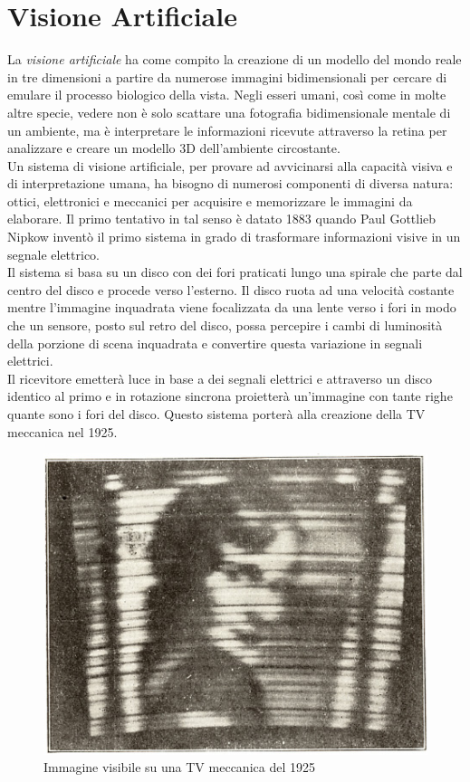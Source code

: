 \chapter{Visione Artificiale}
\fancyfoot[C]{\thepage } 
La \textit{visione artificiale} ha come compito la creazione di 
un modello del mondo reale in tre dimensioni a partire da numerose 
immagini bidimensionali per cercare di emulare il processo biologico della vista.
Negli esseri umani, così come in molte altre specie, vedere non è solo scattare una 
fotografia bidimensionale mentale di un ambiente, ma è interpretare le informazioni
ricevute attraverso la retina per analizzare e creare un modello 3D dell'ambiente
circostante.\\	
Un sistema di visione artificiale, per provare ad avvicinarsi alla capacità visiva
e di interpretazione umana, ha bisogno di numerosi componenti di diversa natura: 
ottici, elettronici e meccanici per acquisire e memorizzare le immagini da elaborare.
Il primo tentativo in tal senso è datato 1883 quando  Paul Gottlieb Nipkow 
inventò il primo sistema in grado di trasformare informazioni visive in un segnale elettrico.\cite{Nipkow1} 
\\Il sistema si basa su un disco con dei fori praticati lungo una spirale che parte dal centro del disco
e procede verso l'esterno. Il disco ruota ad una velocità costante mentre l'immagine 
inquadrata viene focalizzata da una lente verso i fori in modo che un sensore, 
posto sul retro del disco, possa percepire i cambi di luminosità della porzione di scena
inquadrata e convertire questa variazione in segnali elettrici. 
\\Il ricevitore emetterà luce in base a dei 
segnali elettrici e attraverso un disco identico al primo e in rotazione sincrona 
proietterà un'immagine con tante righe quante sono i fori del disco.\cite{Nipkow2} 
Questo sistema porterà alla creazione della TV meccanica nel 1925.
\begin{figure}[!htb] \center
\includegraphics[width=\textwidth]{immagini/tv_meccanica.png}
\caption{Immagine visibile su una TV meccanica del 1925} 
\end{figure}

